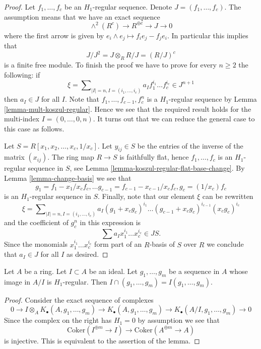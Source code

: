 \begin{proof}
Let $f_1, \ldots, f_c$ be an $H_1$-regular sequence.
Denote $J = (f_1, \ldots, f_c)$. The assumption means that we have
an exact sequence
$$
\wedge^2(R^c) \to R^{\oplus c} \to J \to 0
$$
where the first arrow is given by $e_i \wedge e_j \mapsto f_ie_j - f_je_i$.
In particular this implies that
$$
J/J^2 = J \otimes_R R/J = (R/J)^c
$$
is a finite free module. To finish the proof we have to prove
for every $n \geq 2$ the following: if
$$
\xi = \sum\nolimits_{|I| = n, I = (i_1, \ldots, i_c)}
a_I f_1^{i_1} \ldots f_c^{i_c} \in J^{n + 1}
$$
then $a_I \in J$ for all $I$. Note that $f_1, \ldots, f_{c - 1}, f_c^n$
is a $H_1$-regular sequence by
Lemma \ref{lemma-mult-koszul-regular}.
Hence we see that the required result holds for
the multi-index $I = (0, \ldots, 0, n)$. It turns out that we can
reduce the general case to this case as follows.

\medskip\noindent
Let $S = R[x_1, x_2, \ldots, x_c, 1/x_c]$.
Let $y_{ij} \in S$ be the entries of the inverse of the matrix $(x_{ij})$.
The ring map $R \to S$ is faithfully
flat, hence $f_1, \ldots, f_c$ is an $H_1$-regular sequence in $S$, see
Lemma \ref{lemma-koszul-regular-flat-base-change}.
By
Lemma \ref{lemma-change-basis}
we see that
$$
g_1 = f_1 - x_1/x_c f_c, \ldots
g_{c - 1} = f_{c - 1} - x_{c - 1}/x_c f_c,
g_c = (1/x_c)f_c
$$
is an $H_1$-regular sequence in $S$. Finally, note that our element
$\xi$ can be rewritten
$$
\xi = \sum\nolimits_{|I| = n, I = (i_1, \ldots, i_c)}
a_I (g_1 + x_c g_c)^{i_1} \ldots (g_{c - 1} + x_c g_c)^{i_{c - 1}}
(x_cg_c)^{i_c}
$$
and the coefficient of $g_c^n$ in this expression is
$$
\sum a_I x_1^{i_1} \ldots x_c^{i_c} \in JS.
$$
Since the monomials $x_1^{i_1} \ldots x_c^{i_c}$ form part of an $R$-basis
of $S$ over $R$ we conclude that $a_I \in J$ for all $I$ as desired.
\end{proof}

\begin{lemma}
\label{lemma-H1-regular-in-quotient}
Let $A$ be a ring. Let $I \subset A$ be an ideal.
Let $g_1, \ldots, g_m$ be a sequence in $A$ whose image in
$A/I$ is $H_1$-regular. Then $I \cap (g_1, \ldots, g_m) =
I(g_1, \ldots, g_m)$.
\end{lemma}

\begin{proof}
Consider the exact sequence of complexes
$$
0 \to I \otimes_A K_\bullet(A, g_1, \ldots, g_m)
\to K_\bullet(A, g_1, \ldots, g_m) \to
K_\bullet(A/I, g_1, \ldots, g_m) \to 0
$$
Since the complex on the right has $H_1 = 0$ by assumption we
see that
$$
\text{Coker}(I^{\oplus m} \to I)
\longrightarrow
\text{Coker}(A^{\oplus m} \to A)
$$
is injective. This is equivalent to the assertion of the lemma.
\end{proof}

